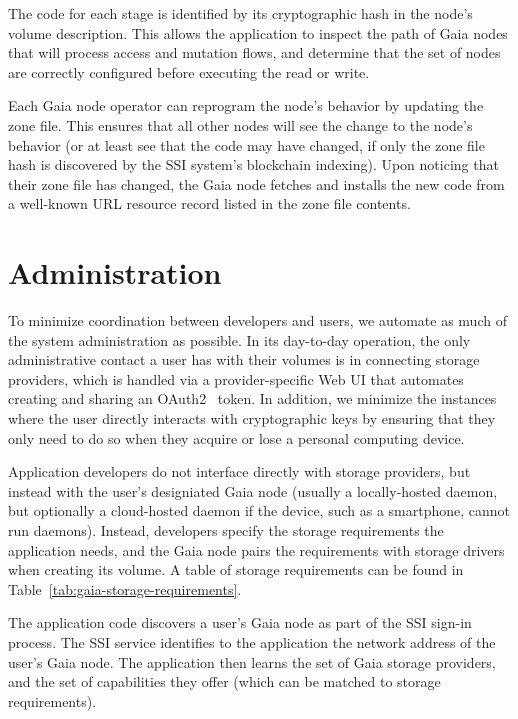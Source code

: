 The code for each stage is identified by its cryptographic hash in the node's
volume description.  This allows the application to inspect the path of Gaia nodes that
will process access and mutation flows, and determine that the set of nodes are
correctly configured before executing the read or write.

Each Gaia node operator can reprogram the node's behavior by updating the zone file.
This ensures that all other nodes will see the change to the node's behavior (or
at least see that the code may have changed, if only the zone file hash is
discovered by the SSI system's blockchain indexing).  Upon noticing that their
zone file has changed, the Gaia node fetches and installs the new code from a
well-known URL resource record listed in the zone file contents.

\section{Administration}

To minimize coordination between developers and users, we
automate as much of the system administration as possible.
In its day-to-day operation, the only administrative contact a user has with their volumes is
in connecting storage providers, which is handled via a provider-specific Web UI
that automates creating and sharing an OAuth2~\cite{oauth2} token.  In addition,
we minimize the instances where the user directly interacts with cryptographic keys
by ensuring that they only need to do so when they acquire or lose a personal
computing device.

Application developers do not interface directly with storage providers, but
instead with the user's designiated Gaia node (usually a locally-hosted daemon,
but optionally a cloud-hosted daemon if the device, such as a smartphone, cannot
run daemons).  Instead, developers specify the storage requirements the
application needs, and the Gaia node pairs the requirements with storage drivers
when creating its volume.  A table of storage requirements can be found in
Table~\ref{tab:gaia-storage-requirements}.


The application code discovers a user's Gaia node as part of the SSI sign-in
process.  The SSI service identifies to the application the network address
of the user's Gaia node.  The application then learns the set of Gaia storage
providers, and the set of capabilities they offer (which can be matched to
storage requirements).

